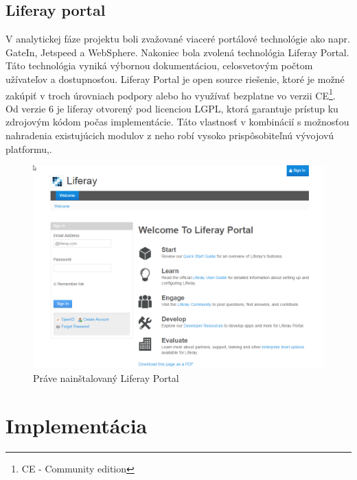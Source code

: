 \documentclass[
  print, %
  table,   %
  lof,     %
  nolot,     %
]{fithesis3}
\begin{document}
\section{Liferay portal}
V analytickej fáze projektu boli zvažované viaceré portálové technológie ako napr. GateIn, Jetspeed a WebSphere. Nakoniec bola zvolená technológia Liferay Portal. Táto technológia vyniká výbornou dokumentáciou, celosvetovým počtom užívateľov a dostupnosťou. Liferay Portal je open source riešenie, ktoré je možné zakúpiť v troch úrovniach podpory alebo ho využívať bezplatne vo verzii CE\footnote{CE - Community edition}. Od verzie 6 je liferay otvorený pod licenciou LGPL, ktorá garantuje prístup ku zdrojovým kódom počas implementácie. Táto vlastnosť v kombinácií s možnosťou nahradenia existujúcich modulov z neho robí vysoko prispôsobiteľnú vývojovú platformu\cite{yuan-interface},\cite{yuan-build}.
\clearpage
\begin{figure}[H]
	\centering
		\includegraphics[width=\textwidth]{fithesis/obr/liferayUvod.png}
	
	\caption{Práve nainštalovaný Liferay Portal}
	\label{liferayUvod}
\end{figure}

\chapter{Implementácia}
\end{document}
